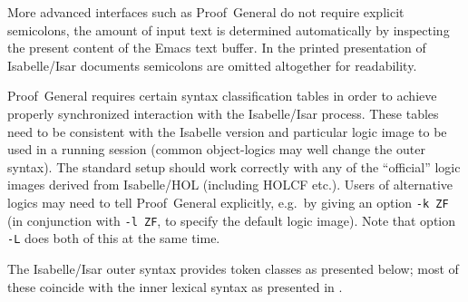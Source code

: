 \begin{isabellebody}
\begin{isamarkuptext}
  More advanced interfaces such as Proof~General \cite{proofgeneral}
  do not require explicit semicolons, the amount of input text is
  determined automatically by inspecting the present content of the
  Emacs text buffer.  In the printed presentation of Isabelle/Isar
  documents semicolons are omitted altogether for readability.

  \begin{warn}
    Proof~General requires certain syntax classification tables in
    order to achieve properly synchronized interaction with the
    Isabelle/Isar process.  These tables need to be consistent with
    the Isabelle version and particular logic image to be used in a
    running session (common object-logics may well change the outer
    syntax).  The standard setup should work correctly with any of the
    ``official'' logic images derived from Isabelle/HOL (including
    HOLCF etc.).  Users of alternative logics may need to tell
    Proof~General explicitly, e.g.\ by giving an option \verb|-k ZF|
    (in conjunction with \verb|-l ZF|, to specify the default
    logic image).  Note that option \verb|-L| does both
    of this at the same time.
  \end{warn}%
\end{isamarkuptext}%
\isamarkuptrue%
%
\isamarkuptrue%
%
\begin{isamarkuptext}%
The Isabelle/Isar outer syntax provides token classes as presented
  below; most of these coincide with the inner lexical syntax as
  presented in \cite{isabelle-ref}.


\end{isamarkuptext}
\end{isabellebody}

